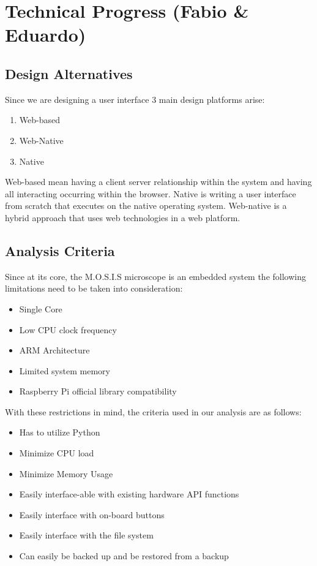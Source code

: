 \section{Technical Progress (Fabio \& Eduardo)}
\subsection{Design Alternatives}
Since we are designing a user interface 3 main design platforms arise:
\begin{enumerate}
	\item Web-based
	\item Web-Native
	\item Native
\end{enumerate}
Web-based mean having a client server relationship within the system and having all interacting occurring within the browser.
Native is writing a user interface from scratch that executes on the native operating system.
Web-native is a hybrid approach that uses web technologies in a web platform.
\subsection{Analysis Criteria}
Since at its core, the M.O.S.I.S microscope is an embedded system the following limitations need to be taken into consideration:
\begin{itemize}
	\item Single Core
	\item Low CPU clock frequency
	\item ARM Architecture
	\item Limited system memory
	\item Raspberry Pi official library compatibility
\end{itemize}
With these restrictions in mind, the criteria used in our analysis are as follows:
\begin{itemize}
	\item Has to utilize Python
	\item Minimize CPU load
	\item Minimize Memory Usage
	\item Easily interface-able with existing hardware API functions
	\item Easily interface with on-board buttons
	\item Easily interface with the file system
	\item Can easily be backed up and be restored from a backup
\end{itemize}
